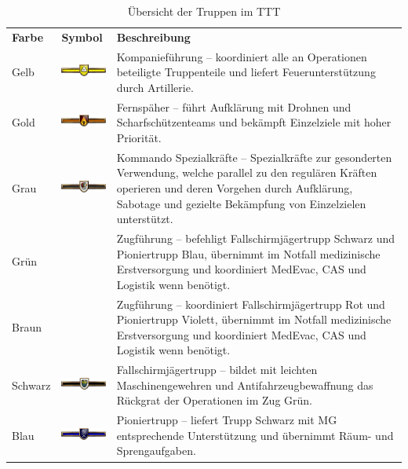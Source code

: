 	\begin{longtable}{| >{\columncolor{backcolor}}l |p{3cm} | p{10cm} |} 
		\caption[Truppübersicht]{Übersicht der Truppen im TTT} \\
		\hline
		\textbf{Farbe} & \textbf{Symbol} & \textbf{Beschreibung} \\
		Gelb & \includegraphics [width=20mm]{./Grafiken/Abschnitt/TrGelb} & Kompanieführung -- koordiniert alle an Operationen beteiligte Truppenteile und liefert Feuerunterstützung durch Artillerie. \\
		\hline
		Gold & \includegraphics[width=20mm]{./Grafiken/Abschnitt/TrGold} & Fernspäher -- führt Aufklärung mit Drohnen und Scharfschützenteams und bekämpft Einzelziele mit hoher Priorität.\\
		\hline
		Grau & \includegraphics[width=20mm]{./Grafiken/Abschnitt/TrGrau} & Kommando Spezialkräfte -- Spezialkräfte zur gesonderten Verwendung, welche parallel zu den regulären Kräften operieren und deren Vorgehen durch Aufklärung, Sabotage und gezielte Bekämpfung von Einzelzielen unterstützt. \\
		\hline
		Grün &  & Zugführung -- befehligt Fallschirmjägertrupp Schwarz und Pioniertrupp Blau, übernimmt im Notfall medizinische Erstversorgung und koordiniert \ac{MedEvac}, \ac{CAS} und Logistik wenn benötigt. \\
		\hline
		Braun &   &Zugführung -- koordiniert Fallschirmjägertrupp Rot und Pioniertrupp Violett, übernimmt im Notfall medizinische Erstversorgung und koordiniert \ac{MedEvac}, \ac{CAS} und Logistik wenn benötigt. \\	
		\hline
		Schwarz & \includegraphics[width=20mm]{./Grafiken/Abschnitt/TrSchwarz} &Fallschirmjägertrupp -- bildet mit leichten Maschinengewehren und Antifahrzeugbewaffnung das Rückgrat der Operationen im Zug Grün. \\
		\hline
		Blau & \includegraphics[width=20mm]{./Grafiken/Abschnitt/TrBlau} & Pioniertrupp -- liefert Trupp Schwarz mit MG entsprechende Unterstützung und übernimmt Räum- und Sprengaufgaben.\\

\end{longtable}

